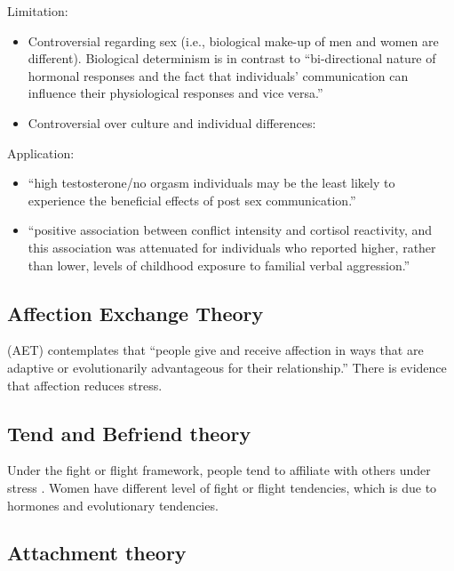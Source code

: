 \documentclass[
]{book}
\providecommand{\tightlist}{%
  \setlength{\itemsep}{0pt}\setlength{\parskip}{0pt}}
\begin{document}
Limitation:

\begin{itemize}
\tightlist
\item
  Controversial regarding sex (i.e., biological make-up of men and women are different). Biological determinism is in
  contrast to ``bi-directional nature of hormonal responses and the fact that individuals' communication can influence
  their physiological responses and vice versa.''
\item
  Controversial over culture and individual differences:
\end{itemize}

Application:

\begin{itemize}
\tightlist
\item
  \citep{Denes_2016} ``high testosterone/no orgasm individuals may be the least likely to experience the beneficial effects
  of post sex communication.''
\item
  \citep{Aloia_2014} ``positive association between conflict intensity and cortisol reactivity, and this association was
  attenuated for individuals who reported higher, rather than lower, levels of childhood exposure to familial verbal
  aggression.''
\end{itemize}

\hypertarget{affection-exchange-theory}{%
\subsection{Affection Exchange Theory}\label{affection-exchange-theory}}

(AET) \citep{Floyd_2001} contemplates that ``people give and receive affection in ways that are adaptive or evolutionarily
advantageous for their relationship.'' There is evidence that affection reduces stress.

\hypertarget{tend-and-befriend-theory}{%
\subsection{Tend and Befriend theory}\label{tend-and-befriend-theory}}

Under the fight or flight framework, people tend to affiliate with others under stress \citep{Taylor_2012}. Women have
different level of fight or flight tendencies, which is due to hormones and evolutionary tendencies.

\hypertarget{attachment-theory}{%
\subsection{Attachment theory}\label{attachment-theory}}
\end{document}
